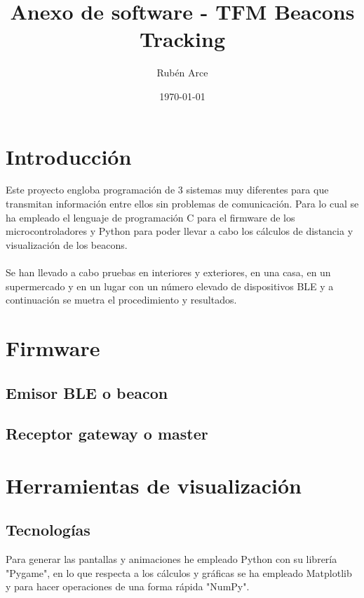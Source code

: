 \documentclass[a4paper ,12pt, onecolumn]{article}
\begin{document}
\pagestyle{fancy}
\title{Anexo de software - TFM Beacons Tracking}
\author{Rubén Arce}
\date{\today}
\maketitle
\cleardoublepage
\tableofcontents
\listoffigures
\cleardoublepage
\section{Introducción}
    Este proyecto engloba programación de 3 sistemas muy diferentes para que transmitan información entre ellos 
    sin problemas de comunicación. Para lo cual se ha empleado el lenguaje de programación C para el firmware de los 
    microcontroladores y Python para poder llevar a cabo los cálculos de distancia y visualización de los beacons.
    \paragraph{}
    Se han llevado a cabo pruebas en interiores y exteriores, en una casa, en un supermercado y en un lugar con un número elevado de dispositivos BLE y
    a continuación se muetra el procedimiento y resultados.
\section{Firmware}
    \subsection{Emisor BLE o beacon}
    \subsection{Receptor gateway o master}
       
\section{Herramientas de visualización}
    \subsection{Tecnologías}
        Para generar las pantallas y animaciones he empleado Python con su librería "Pygame", en lo que respecta a los cálculos 
        y gráficas se ha empleado Matplotlib y para hacer operaciones de una forma rápida "NumPy".    
\end{document}
